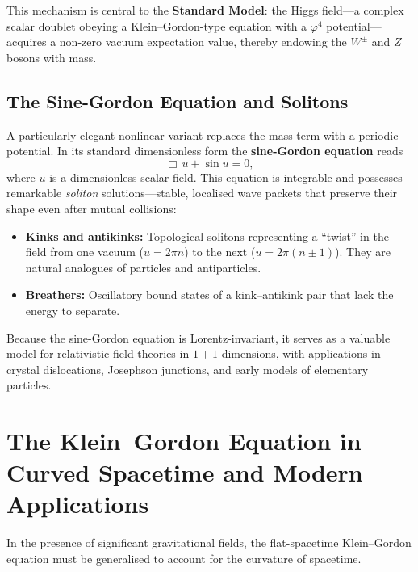 \documentclass[12pt, a4paper]{article}
\theoremstyle{definition}
\begin{document}
This mechanism is central to the \textbf{Standard Model}: the Higgs field---a
complex scalar doublet obeying a Klein--Gordon-type equation with a
$\varphi^{4}$ potential---acquires a non-zero vacuum expectation value,
thereby endowing the $W^{\pm}$ and $Z$ bosons with mass.

\subsection{The Sine-Gordon Equation and Solitons}

A particularly elegant nonlinear variant replaces the mass term with a
periodic potential.  In its standard dimensionless form the
\textbf{sine-Gordon equation} reads
\begin{equation}\label{eq:sine-gordon}
    \Box\,u + \sin u = 0,
\end{equation}
where $u$ is a dimensionless scalar field.  This equation is integrable and
possesses remarkable \emph{soliton} solutions---stable, localised wave packets
that preserve their shape even after mutual collisions:

\begin{itemize}
    \item \textbf{Kinks and antikinks:} Topological solitons representing a
          ``twist'' in the field from one vacuum ($u = 2\pi n$) to
          the next ($u = 2\pi(n\pm 1)$).  They are natural analogues
          of particles and antiparticles.
    \item \textbf{Breathers:} Oscillatory bound states of a kink--antikink
          pair that lack the energy to separate.
\end{itemize}

Because the sine-Gordon equation is Lorentz-invariant, it serves as a
valuable model for relativistic field theories in $1\!+\!1$ dimensions, with
applications in crystal dislocations, Josephson junctions, and early models of
elementary particles.

\section{The Klein--Gordon Equation in Curved Spacetime and Modern Applications}
\label{sec:curved-st}

In the presence of significant gravitational fields, the flat-spacetime
Klein--Gordon equation must be generalised to account for the curvature of
spacetime.
\end{document}
